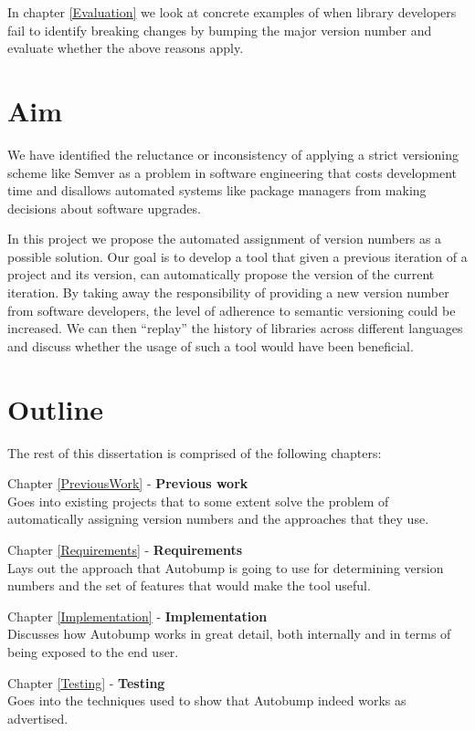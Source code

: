 \documentclass{l4proj}
\begin{document}
In chapter \ref{Evaluation} we look at concrete examples of when
library developers fail to identify breaking changes by bumping the
major version number and evaluate whether the above reasons apply.

\section{Aim}

We have identified the reluctance or inconsistency of applying a
strict versioning scheme like Semver as a problem in software
engineering that costs development time and disallows automated
systems like package managers from making decisions about software
upgrades.

In this project we propose the automated assignment of version numbers
as a possible solution. Our goal is to develop a tool that given a
previous iteration of a project and its version, can automatically
propose the version of the current iteration. By taking away the
responsibility of providing a new version number from software
developers, the level of adherence to semantic versioning could be
increased. We can then ``replay'' the history of libraries across
different languages and discuss whether the usage of such a tool would
have been beneficial.

\clearpage
\section{Outline}

The rest of this dissertation is comprised of the following chapters:

\noindent Chapter \ref{PreviousWork} - \textbf{Previous work} \\
Goes into existing projects that to some extent solve the problem
of automatically assigning version numbers and the approaches that
they use.

\noindent Chapter \ref{Requirements} - \textbf{Requirements} \\
Lays out the approach that Autobump is going to use for
determining version numbers and the set of features that would make
the tool useful.

\noindent Chapter \ref{Implementation} - \textbf{Implementation} \\
Discusses how Autobump works in great detail, both internally and
in terms of being exposed to the end user.

\noindent Chapter \ref{Testing} - \textbf{Testing} \\
Goes into the techniques used to show that Autobump indeed works
as advertised.
\end{document}
